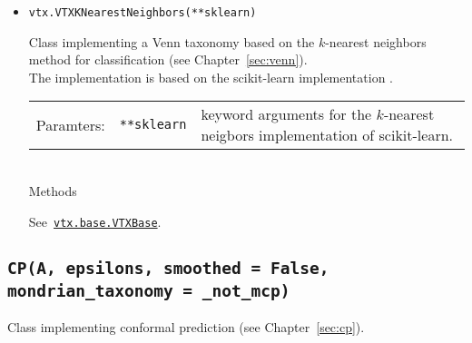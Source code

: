\documentclass[twoside,11pt]{article}
\def\wo{~\\}
\begin{document}
\begin{appendices}
\begin{itemize}
\begin{itemize}
\begin{itemize}
              \end{itemize}

          \end{itemize}

        \item
          \texttt{vtx.VTXKNearestNeighbors(**sklearn)}

          Class implementing a Venn taxonomy based
          on the $k$-nearest neighbors method for
          classification (see Chapter~\ref{sec:venn}).
          \\

          The implementation is based on the scikit-learn
          implementation \citep[see][]{sklearn_api}.
          \\

          \begin{tabu}{llX}
            Paramters: &\texttt{**sklearn}
                       &keyword arguments for the
                        $k$-nearest neigbors implementation
                        of scikit-learn.
          \end{tabu}
          \wo

          Methods

          See~\hyperref[itm:vtxbase]
          {\texttt{vtx.base.VTXBase}}.
          \\


      \end{itemize}

    \subsection*{\texttt{CP(A, epsilons, smoothed = False,
        mondrian\_taxonomy = \_not\_mcp)}}
      \label{itm:cp}

      Class implementing conformal prediction
      (see Chapter~\ref{sec:cp}).
      \\


\end{appendices}
\end{document}
